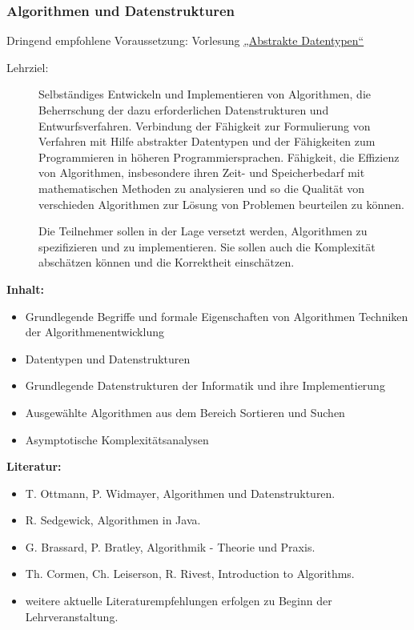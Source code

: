 \documentclass[%
a4paper, %
11pt,               %
leqno,              %
fleqn,              %
]
{scrartcl}
\begin{document}

\subsubsection{Algorithmen und Datenstrukturen} %
\label{ssub:Algorithmen und Datenstrukturen}

Dringend empfohlene Voraussetzung: Vorlesung \hyperref[ssub:Abstrakte
Datentypen]{„Abstrakte Datentypen“}

\begin{description}
  \item[Lehrziel:] Selbständiges Entwickeln und Implementieren von Algorithmen,
    die Beherrschung der dazu erforderlichen Datenstrukturen und
    Entwurfsverfahren. Verbindung der Fähigkeit zur Formulierung von Verfahren
    mit Hilfe abstrakter Datentypen und der Fähigkeiten zum Programmieren in
    höheren Programmiersprachen. Fähigkeit, die Effizienz von Algorithmen,
    insbesondere ihren Zeit- und Speicherbedarf mit mathematischen Methoden zu
    analysieren und so die Qualität von verschieden Algorithmen zur Lösung von
    Problemen beurteilen zu können.

    Die Teilnehmer sollen in der Lage versetzt werden, Algorithmen zu
    spezifizieren und zu implementieren. Sie sollen auch die Komplexität
    abschätzen können und die Korrektheit einschätzen.
\end{description}
\textsf{\textbf{Inhalt:}}
\begin{itemize}\itemsep0pt
  \item Grundlegende Begriffe und formale Eigenschaften von Algorithmen
    Techniken der Algorithmenentwicklung
  \item Datentypen und Datenstrukturen
  \item Grundlegende Datenstrukturen der Informatik und ihre Implementierung
  \item Ausgewählte Algorithmen aus dem Bereich Sortieren und Suchen
  \item Asymptotische Komplexitätsanalysen
\end{itemize}
\textsf{\textbf{Literatur:}}
\begin{itemize}\itemsep0pt
  \item T. Ottmann, P. Widmayer, Algorithmen und Datenstrukturen.
  \item R. Sedgewick, Algorithmen in Java.
  \item G. Brassard, P. Bratley, Algorithmik - Theorie und Praxis.
  \item Th. Cormen, Ch. Leiserson, R. Rivest, Introduction to Algorithms.
  \item weitere aktuelle Literaturempfehlungen erfolgen zu Beginn der
    Lehrveranstaltung.
\end{itemize}
\end{document}
